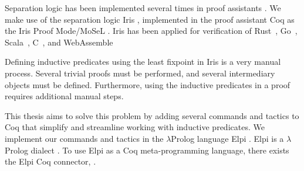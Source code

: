 \documentclass[thesis.tex]{subfiles}
\begin{document}
Separation logic has been implemented several times in proof assistants \cite{appelTacticsSeparationLogic,rouvoetIntrinsicallyTypedCompilation2021,chlipalaMostlyautomatedVerificationLowlevel2011,bengtsonCharge2012}. We make use of the separation logic Iris \cite*{jungIrisMonoidsInvariants2015a,jungHigherorderGhostState2016,krebbersEssenceHigherOrderConcurrent2017,jungIrisGroundModular2018}, implemented in the proof assistant Coq as the Iris Proof Mode/MoSeL \cite{krebbersInteractiveProofsHigherorder2017,krebbersMoSeLGeneralExtensible2018}. Iris has been applied for verification of Rust~\cite{jungRustBeltSecuringFoundations2017,dangRustBeltMeetsRelaxed2019,matsushitaRustHornBeltSemanticFoundation2022}, Go~\cite{chajedVerifyingConcurrentCrashsafe2019}, Scala~\cite{giarrussoScalaStepbystepSoundness2020}, C~\cite{sammlerRefinedCAutomatingFoundational2021}, and WebAssemble~\cite{raoIrisWasmRobustModular2023}

Defining inductive predicates using the least fixpoint in Iris is a very manual process. Several trivial proofs must be performed, and several intermediary objects must be defined. Furthermore, using the inductive predicates in a proof requires additional manual steps.

This thesis aims to solve this problem by adding several commands and tactics to Coq that simplify and streamline working with inductive predicates. We implement our commands and tactics in the $\lambda$Prolog language Elpi \cite{dunchevELPIFastEmbeddable2015,guidiImplementingTypeTheory2019}. Elpi is a $\lambda$Prolog dialect \cite{millerHigherorderLogicProgramming1986,millerUniformProofsFoundation1991,belleanneePragmaticReconstructionLProlog1999,millerProgrammingHigherOrderLogic2012}. To use Elpi as a Coq meta-programming language, there exists the Elpi Coq connector, \ce \cite{tassiElpiExtensionLanguage2018}.
\end{document}
